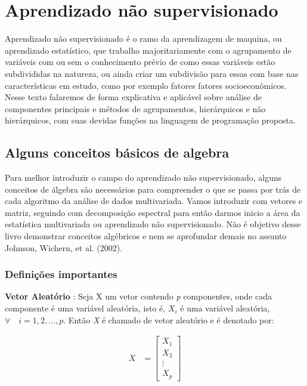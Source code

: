 \documentclass[
  letterpaper,
  DIV=11,
  numbers=noendperiod]{scrreprt}
\begin{document}
\hypertarget{aprendizado-nuxe3o-supervisionado}{%
\chapter{Aprendizado não
supervisionado}\label{aprendizado-nuxe3o-supervisionado}}

Aprendizado não supervisionado é o ramo da aprendizagem de maquina, ou
aprendizado estatístico, que trabalho majoritariamente com o agrupamento
de variáveis com ou sem o conhecimento prévio de como essas variáveis
estão subdivididas na natureza, ou ainda criar um subdivisão para essas
com base nas características em estudo, como por exemplo fatores fatores
socioeconômicos. Nesse texto falaremos de forma explicativa e aplicável
sobre análise de componentes principais e métodos de agrupamentos,
hierárquicos e não hierárquicos, com suas devidas funções na linguagem
de programação proposta.

\hypertarget{alguns-conceitos-buxe1sicos-de-algebra}{%
\section{Alguns conceitos básicos de
algebra}\label{alguns-conceitos-buxe1sicos-de-algebra}}

Para melhor introduzir o campo do aprendizado não supervisionado, alguns
conceitos de álgebra são necessários para compreender o que se passa por
trás de cada algoritmo da análise de dados multivariada. Vamos
introduzir com vetores e matriz, seguindo com decomposição espectral
para então darmos inicio a área da estatística multivariada ou
aprendizado não supervisionado. Não é objetivo desse livro demonstrar
conceitos algébricos e nem se aprofundar demais no assunto Johnson,
Wichern, et al. (2002).

\hypertarget{definiuxe7uxf5es-importantes}{%
\subsection{Definições importantes}\label{definiuxe7uxf5es-importantes}}

\textbf{Vetor Aleatório} : Seja X um vetor contendo \emph{p}
componentes, onde cada componente é uma variável aleatória, isto é,
\(X_i\) é uma variável aleatória, \(\forall\quad i =1,2,...,p\). Então
\emph{X} é chamado de vetor aleatório e é denotado por:

\[
 \begin{align}
  X &= \begin{bmatrix}
           X_{1} \\
           X_{2} \\
           \vdots \\
           X_{p}
         \end{bmatrix}
  \end{align}
\]
\end{document}
